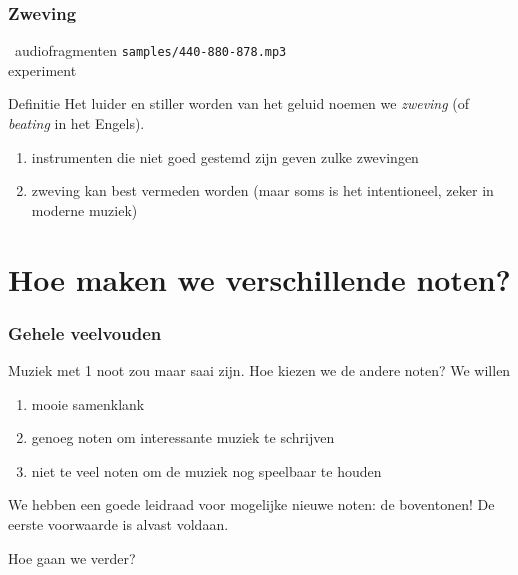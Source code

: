 \documentclass[compress, darktitle, framenumber, handout, totalframenumber]{beamer}
\begin{document}
\begin{frame}
  \frametitle{Zweving}

  \begin{block}{\twonotes\ audiofragmenten}
    \texttt{samples/440-880-878.mp3} \\
    experiment
  \end{block}

  \pause

  \begin{alertblock}{Definitie}
    Het luider en stiller worden van het geluid noemen we \emph{zweving} (of \emph{beating} in het Engels).
  \end{alertblock}

  \begin{enumerate}
    \item instrumenten die niet goed gestemd zijn geven zulke zwevingen
    \item zweving kan best vermeden worden (maar soms is het intentioneel, zeker in moderne muziek)
  \end{enumerate}
\end{frame}


\section{Hoe maken we verschillende noten?}

\begin{frame}
  \frametitle{Gehele veelvouden}

  Muziek met 1 noot zou maar saai zijn. Hoe kiezen we de andere noten? \pause We willen
  \begin{enumerate}
    \item mooie samenklank
    \item \pause genoeg noten om interessante muziek te schrijven
    \item \pause niet te veel noten om de muziek nog speelbaar te houden
  \end{enumerate}

  We hebben een goede leidraad voor mogelijke nieuwe noten: de \alert{boventonen}! De eerste voorwaarde is alvast voldaan.

  Hoe gaan we verder?
\end{frame}
\end{document}
